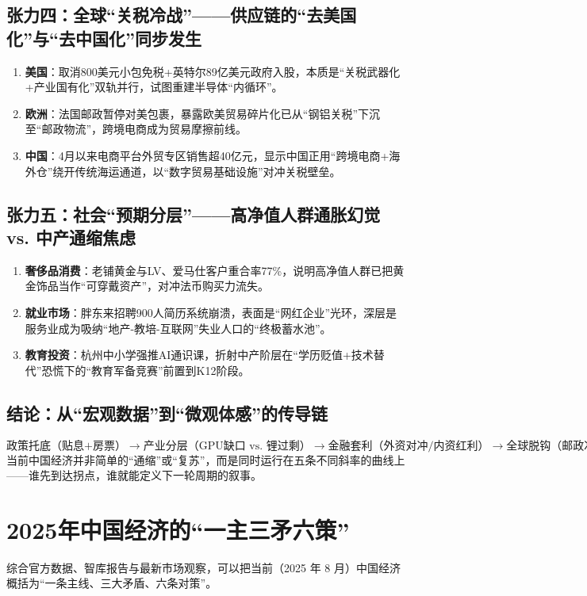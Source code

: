 \subsection{张力四：全球“关税冷战”——供应链的“去美国化”与“去中国化”同步发生}
\begin{enumerate}[leftmargin=*, nosep]
    \item \textbf{美国}：取消800美元小包免税+英特尔89亿美元政府入股，本质是“关税武器化+产业国有化”双轨并行，试图重建半导体“内循环”。
    \item \textbf{欧洲}：法国邮政暂停对美包裹，暴露欧美贸易碎片化已从“钢铝关税”下沉至“邮政物流”，跨境电商成为贸易摩擦前线。
    \item \textbf{中国}：4月以来电商平台外贸专区销售超40亿元，显示中国正用“跨境电商+海外仓”绕开传统海运通道，以“数字贸易基础设施”对冲关税壁垒。
\end{enumerate}

\subsection{张力五：社会“预期分层”——高净值人群通胀幻觉 vs. 中产通缩焦虑}
\begin{enumerate}[leftmargin=*, nosep]
    \item \textbf{奢侈品消费}：老铺黄金与LV、爱马仕客户重合率77\%，说明高净值人群已把黄金饰品当作“可穿戴资产”，对冲法币购买力流失。
    \item \textbf{就业市场}：胖东来招聘900人简历系统崩溃，表面是“网红企业”光环，深层是服务业成为吸纳“地产-教培-互联网”失业人口的“终极蓄水池”。
    \item \textbf{教育投资}：杭州中小学强推AI通识课，折射中产阶层在“学历贬值+技术替代”恐慌下的“教育军备竞赛”前置到K12阶段。
\end{enumerate}

\subsection{结论：从“宏观数据”到“微观体感”的传导链}
\[
\text{政策托底（贴息+房票）} \rightarrow \text{产业分层（GPU缺口 vs. 锂过剩）} \rightarrow \text{金融套利（外资对冲/内资红利）} \rightarrow \text{全球脱钩（邮政冷战）} \rightarrow \text{预期极化（豪宅日光/简历崩溃）}
\]
当前中国经济并非简单的“通缩”或“复苏”，而是同时运行在五条不同斜率的曲线上——谁先到达拐点，谁就能定义下一轮周期的叙事。


\section{2025年中国经济的“一主三矛六策”}
综合官方数据、智库报告与最新市场观察，可以把当前（2025 年 8 月）中国经济概括为“一条主线、三大矛盾、六条对策”。

